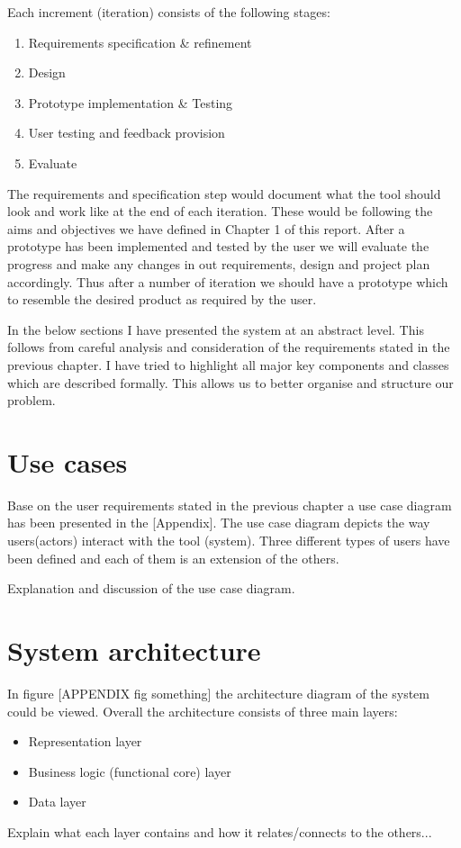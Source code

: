 Each increment (iteration) consists of the following stages:
\begin{enumerate}
	\item Requirements specification \& refinement
	\item Design
	\item Prototype implementation \& Testing
	\item User testing and feedback provision
	\item Evaluate
\end{enumerate}
The requirements and specification step would document what the tool should look and work like at the end of each iteration. These would be following the aims and objectives we have defined in Chapter 1 of this report. After a prototype has been implemented and tested by the user we will evaluate the progress and make any changes in out requirements, design and project plan accordingly. Thus after a number of iteration we should have a prototype which to resemble the desired product as required by the user.

In the below sections I have presented the system at an abstract level. This follows from careful analysis and consideration of the requirements stated in the previous chapter. I have tried to highlight all major key components and classes which are described formally. This allows us to better organise and structure our problem. 

\section{Use cases}
Base on the user requirements stated in the previous chapter a use case diagram has been presented in the [Appendix]. The use case diagram depicts the way users(actors) interact with the tool (system). Three different types of users have been defined and each of them is an extension of the others. 
 
Explanation and discussion of the use case diagram.

\section{System architecture}
In figure [APPENDIX fig something] the architecture diagram of the system could be viewed. Overall the architecture consists of three main layers:
\begin{itemize}
	\item Representation layer
	\item Business logic (functional core) layer
	\item Data layer
\end{itemize}
Explain what each layer contains and how it relates/connects to the others...

